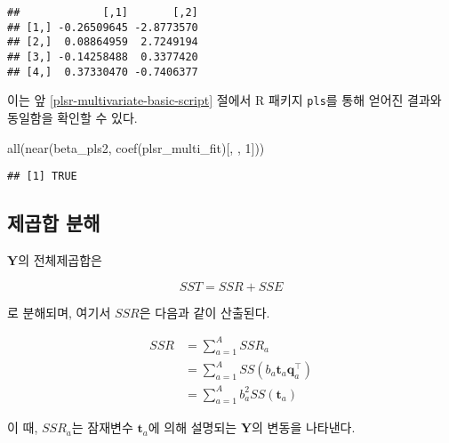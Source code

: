 \documentclass[
]{book}
\newenvironment{Shaded}{\begin{snugshade}}{\end{snugshade}}
\newcommand{\DecValTok}[1]{\textcolor[rgb]{0.00,0.00,0.81}{#1}}
\newcommand{\FunctionTok}[1]{\textcolor[rgb]{0.00,0.00,0.00}{#1}}
\newcommand{\NormalTok}[1]{#1}
\newcommand{\OtherTok}[1]{\textcolor[rgb]{0.56,0.35,0.01}{#1}}
\newcommand{\SpecialCharTok}[1]{\textcolor[rgb]{0.00,0.00,0.00}{#1}}
\begin{document}
\begin{verbatim}
##             [,1]       [,2]
## [1,] -0.26509645 -2.8773570
## [2,]  0.08864959  2.7249194
## [3,] -0.14258488  0.3377420
## [4,]  0.37330470 -0.7406377
\end{verbatim}

이는 앞 \ref{plsr-multivariate-basic-script} 절에서 R 패키지 \texttt{pls}를 통해 얻어진 결과와 동일함을 확인할 수 있다.

\begin{Shaded}
\begin{Highlighting}[]
\FunctionTok{all}\NormalTok{(}\FunctionTok{near}\NormalTok{(beta\_pls2, }\FunctionTok{coef}\NormalTok{(plsr\_multi\_fit)[, , }\DecValTok{1}\NormalTok{]))}
\end{Highlighting}
\end{Shaded}

\begin{verbatim}
## [1] TRUE
\end{verbatim}

\hypertarget{plsr-multivariate-sst}{%
\subsection{제곱합 분해}\label{plsr-multivariate-sst}}

\(\mathbf{Y}\)의 전체제곱합은

\[SST = SSR + SSE\]

로 분해되며, 여기서 \(SSR\)은 다음과 같이 산출된다.

\begin{equation}
\begin{split}
SSR &= \sum_{a = 1}^{A} SSR_a\\
&= \sum_{a = 1}^{A} SS(b_a \mathbf{t}_a \mathbf{q}_a^\top)\\ 
&= \sum_{a = 1}^{A} b_a^2 SS(\mathbf{t}_a)
\end{split} \label{eq:plsr-multivariate-ssr}
\end{equation}

이 때, \(SSR_a\)는 잠재변수 \(\mathbf{t}_a\)에 의해 설명되는 \(\mathbf{Y}\)의 변동을 나타낸다.

\begin{Shaded}
\end{Shaded}
\end{document}
